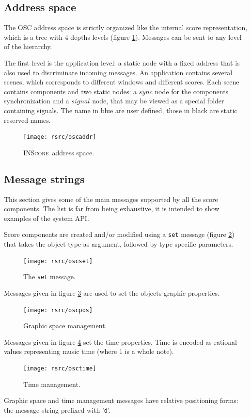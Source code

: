 \documentclass[11pt,letterpaper]{article}
\newcommand{\inscore}		{\textsc{\small INScore}}
\newcommand{\OSC}[1]		{\texttt{#1}}
\begin{document}
\subsection{Address space}

The OSC address space is strictly organized like the internal score representation, which is a tree with 4 depths levels (figure \ref{fig:oscaddr}). Messages can be sent to any level of the hierarchy.

The first level is the application level: a static node with a fixed address that is also used to discriminate incoming messages.
An application contains several scenes, which corresponds to different windows and different scores.
Each scene contains components and two static nodes: a $sync$ node for the components synchronization and a $signal$ node, that may be viewed as a special folder containing signals.
The name in blue are user defined, those in black are static reserved names.
\begin{figure}[htbp]
\centerline{
	\texttt{[image: rsrc/oscaddr]}}
\caption{\inscore\ address space.}
\label{fig:oscaddr}
\end{figure}


\subsection{Message strings}
\label{oscmsgs}

This section gives some of the main messages supported by all the score components. The list is far from being exhaustive, it is intended to show examples of the system API.

Score components are created and/or modified using a \OSC{set} message (figure \ref{osc:set}) that takes the object type as argument, followed by type specific parameters. 
\begin{figure}[htbp]
\centerline{
	\texttt{[image: rsrc/oscset]}}
\caption{The \OSC{set} message.}
\label{osc:set}
\end{figure}

Messages given in figure \ref{osc:pos} are used to set the objects graphic properties.
\begin{figure}[htbp]
\centerline{
	\texttt{[image: rsrc/oscpos]}}
\caption{Graphic space management.}
\label{osc:pos}
\end{figure}

Messages given in figure \ref{osc:time} set the time properties. Time is encoded as rational values representing music time (where 1 is a whole note).
\begin{figure}[htbp]
\centerline{
	\texttt{[image: rsrc/osctime]}}
\caption{Time management.}
\label{osc:time}
\end{figure}
Graphic space and time management messages have relative positioning forms: the message string prefixed with '\OSC{d}'. 
\end{document}

